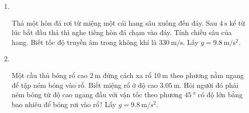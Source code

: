 \begin{enumerate}[label=\bfseries Bài \arabic*:]
\item {}\\
{Thả một hòn đá rơi từ miệng một cái hang sâu xuống đến đáy. Sau $\SI{4}{\second}$ kể từ lúc bắt đầu thả thì nghe tiếng hòn đá chạm vào đáy. Tính chiều sâu của hang. Biết tốc độ truyền âm trong không khí là $\SI{330}{\meter/\second}$. Lấy $g=\SI{9.8}{\meter/\second^2}$.

}

\item {}\\
{Một cầu thủ bóng rổ cao $\SI{2}{\meter}$ đứng cách xa rổ $\SI{10}{\meter}$ theo phương nằm ngang để tập ném bóng vào rổ. Biết miệng rổ ở độ cao $\SI{3.05}{\meter}$. Hỏi người đó phải ném bóng từ độ cao ngang đầu với vận tốc theo phương $\SI{45}{\degree}$ có độ lớn bằng bao nhiêu để bóng rơi vào rổ? Lấy $g=\SI{9.8}{\meter/\second^2}$.

}
\end{enumerate}